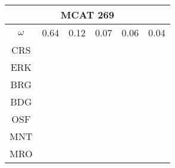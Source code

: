 \documentclass[a4paper,12pt]{article}
\begin{document}
\begin{tabular}{|c|c|c|c|c|c|}%
         \hline \multicolumn{6}{|c|}{MCAT 269} \\ \hline
         $\omega$&0.64&0.12&0.07&0.06&0.04\\ \hline %
        CRS&\cellcolor[HTML]{E41A1C}&\cellcolor[HTML]{E41A1C}&\cellcolor[HTML]{E41A1C}&\cellcolor[HTML]{E41A1C}&\cellcolor[HTML]{E41A1C}\\ \hline %
        ERK&\cellcolor[HTML]{E41A1C}&\cellcolor[HTML]{E41A1C}&\cellcolor[HTML]{E41A1C}&\cellcolor[HTML]{E41A1C}&\cellcolor[HTML]{E41A1C}\\ \hline %
        BRG&\cellcolor[HTML]{377EB8}&\cellcolor[HTML]{E41A1C}&\cellcolor[HTML]{E41A1C}&\cellcolor[HTML]{377EB8}&\cellcolor[HTML]{377EB8}\\ \hline %
        BDG&\cellcolor[HTML]{377EB8}&\cellcolor[HTML]{377EB8}&\cellcolor[HTML]{377EB8}&\cellcolor[HTML]{377EB8}&\cellcolor[HTML]{377EB8}\\ \hline %
        OSF&\cellcolor[HTML]{4DAF4A}&\cellcolor[HTML]{377EB8}&\cellcolor[HTML]{377EB8}&\cellcolor[HTML]{4DAF4A}&\cellcolor[HTML]{377EB8}\\ \hline %
        MNT&\cellcolor[HTML]{4DAF4A}&\cellcolor[HTML]{377EB8}&\cellcolor[HTML]{377EB8}&\cellcolor[HTML]{4DAF4A}&\cellcolor[HTML]{4DAF4A}\\ \hline %
        MRO&\cellcolor[HTML]{4DAF4A}&\cellcolor[HTML]{4DAF4A}&\cellcolor[HTML]{4DAF4A}&\cellcolor[HTML]{4DAF4A}&\cellcolor[HTML]{4DAF4A}\\ \hline %

\end{tabular}
\end{document}
